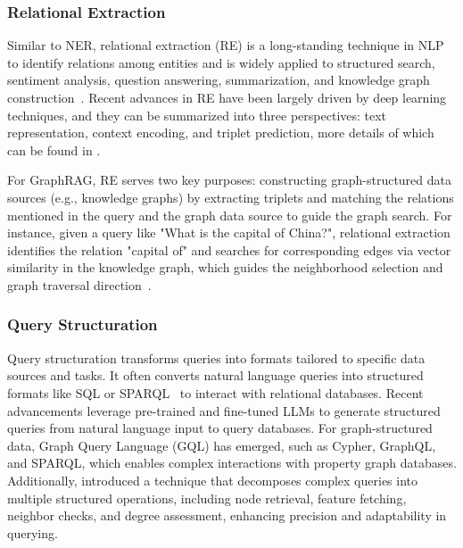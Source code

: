 \subsubsection{Relational Extraction}
Similar to NER, relational extraction (RE) is a long-standing technique in NLP to identify relations among entities and is widely applied to structured search, sentiment analysis, question answering, summarization, and knowledge graph construction~\cite{chen2018knowedu, li2020real, nasar2021named}. Recent advances in RE have been largely driven by deep learning techniques, and they can be summarized into three perspectives: text representation, context encoding, and triplet prediction, more details of which can be found in \citet{pawar2017relation, nasar2021named, han2020more}. 

For GraphRAG, RE serves two key purposes: constructing graph-structured data sources (e.g., knowledge graphs) by extracting triplets and matching the relations mentioned in the query and the graph data source to guide the graph search. For instance, given a query like "What is the capital of China?", relational extraction identifies the relation "capital of" and searches for corresponding edges via vector similarity in the knowledge graph, which guides the neighborhood selection and graph traversal direction~\cite{gao2024two, kim2023kg, luo2023reasoning, luo2024graph}. 



\subsubsection{Query Structuration}

Query structuration transforms queries into formats tailored to specific data sources and tasks. It often converts natural language queries into structured formats like SQL or SPARQL~\cite{jiang2023structgpt, li2023chain} to interact with relational databases. Recent advancements leverage pre-trained and fine-tuned LLMs to generate structured queries from natural language input to query databases. For graph-structured data, Graph Query Language (GQL) has emerged, such as Cypher, GraphQL, and SPARQL, which enables complex interactions with property graph databases. Additionally, \citet{jin2024graph} introduced a technique that decomposes complex queries into multiple structured operations, including node retrieval, feature fetching, neighbor checks, and degree assessment, enhancing precision and adaptability in querying.



